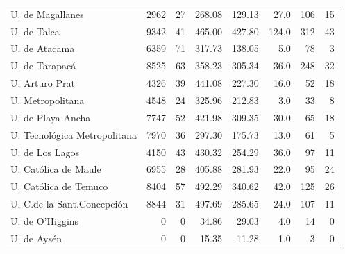 \documentclass[twocolumn]{article}
\begin{document}
\begin{table}[t]
\begin{tabular}{l rrrrrrr}
U. de Magallanes           &  2962 	& 27 &    268.08& 129.13& 27.0  &   106&	 15  \\
U. de Talca	               &  9342 	& 41 &    465.00& 427.80&124.0  &   312&	 43  \\
U. de Atacama              &  6359 	& 71 &    317.73& 138.05&  5.0  &    78&	  3  \\
U. de Tarapacá             &  8525 	& 63 &    358.23& 305.34& 36.0  &   248&	 32  \\
U. Arturo Prat             &  4326 	& 39 &    441.08& 227.30& 16.0  &    52&	 18  \\
U. Metropolitana           &  4548 	& 24 &    325.96& 212.83&  3.0  &    33&	  8  \\
U. de Playa Ancha          &  7747 	& 52 &    421.98& 309.35& 30.0  &    65&	 18  \\
U. Tecnológica Metropolitana& 7970 	& 36 &    297.30& 175.73& 13.0  &    61&	  5  \\
U. de Los Lagos            &  4150 	& 43 &    430.32& 254.29& 36.0  &    97&	 11  \\
U. Católica de Maule       &  6955 	& 28 &    405.88& 281.93& 22.0  &    95&	 24  \\
U. Católica de Temuco      &  8404 	& 57 &    492.29& 340.62& 42.0  &   125&	 26  \\
U. C.de la Sant.Concepción &  8844 	& 31 &    497.69& 285.65& 24.0  &   107&	 11  \\
U. de O'Higgins	           &     0 	&  0 &	   34.86& 29.03 &  4.0  &    14&	  0  \\
U. de Aysén                &	 0  &  0 & 	   15.35& 11.28 &  1.0  &    3 &      0  \\
\hline
\end{tabular}
\end{table}
\end{document}
